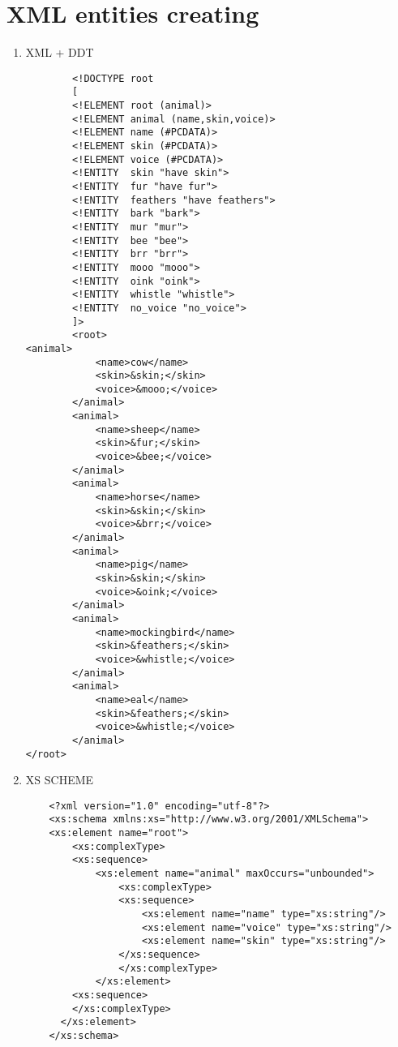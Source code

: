 \documentclass[10pt]{article}
\begin{document}
  \section{XML entities creating    \newline}
  \begin{enumerate}
    \item XML + DDT
    \begin{verbatim}
        <!DOCTYPE root
        [
        <!ELEMENT root (animal)>
        <!ELEMENT animal (name,skin,voice)>
        <!ELEMENT name (#PCDATA)>
        <!ELEMENT skin (#PCDATA)>
        <!ELEMENT voice (#PCDATA)>
        <!ENTITY  skin "have skin">
        <!ENTITY  fur "have fur">
        <!ENTITY  feathers "have feathers">
        <!ENTITY  bark "bark">
        <!ENTITY  mur "mur">
        <!ENTITY  bee "bee">
        <!ENTITY  brr "brr">
        <!ENTITY  mooo "mooo">
        <!ENTITY  oink "oink">
        <!ENTITY  whistle "whistle">
        <!ENTITY  no_voice "no_voice">
        ]>
        <root>
<animal>
            <name>cow</name>
            <skin>&skin;</skin>
            <voice>&mooo;</voice>
        </animal>
        <animal>
            <name>sheep</name>
            <skin>&fur;</skin>
            <voice>&bee;</voice>
        </animal>
        <animal>
            <name>horse</name>
            <skin>&skin;</skin>
            <voice>&brr;</voice>
        </animal>
        <animal>
            <name>pig</name>
            <skin>&skin;</skin>
            <voice>&oink;</voice>
        </animal>
        <animal>
            <name>mockingbird</name>
            <skin>&feathers;</skin>
            <voice>&whistle;</voice>
        </animal>
        <animal>
            <name>eal</name>
            <skin>&feathers;</skin>
            <voice>&whistle;</voice>
        </animal>
</root>
    \end{verbatim}
    \item XS SCHEME
    \begin{verbatim}
    <?xml version="1.0" encoding="utf-8"?>
    <xs:schema xmlns:xs="http://www.w3.org/2001/XMLSchema">
    <xs:element name="root">
        <xs:complexType>
        <xs:sequence>
            <xs:element name="animal" maxOccurs="unbounded">
                <xs:complexType>
                <xs:sequence>
                    <xs:element name="name" type="xs:string"/>
                    <xs:element name="voice" type="xs:string"/>
                    <xs:element name="skin" type="xs:string"/>
                </xs:sequence>
                </xs:complexType>
            </xs:element>
        <xs:sequence>
        </xs:complexType>
      </xs:element>
    </xs:schema>
    \end{verbatim}
  \end{enumerate}
\end{document}
